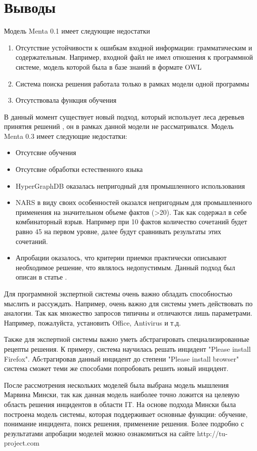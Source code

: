 \section{Выводы}
Модель Menta 0.1 имеет следующие недостатки
\begin{enumerate}
	\item Отсутствие устойчивости к ошибкам входной информации: грамматическим и содержательным. Например, входной файл не имел отношения к программной системе, модель которой была в базе знаний в формате OWL
	\item Система поиска решения работала только в рамках модели одной программы
	\item Отсутствовала функция обучения 
\end{enumerate}\par
В данный момент существует новый подход, который использует леса деревьев принятия решений \cite{DCFOREST}, он в рамках данной модели не рассматривался.
Модель Menta 0.3 имеет следующие недостатки:
\begin{itemize}
	\item Отсутсвие обучения
	\item Отсутсвие обработки естественного языка
	\item HyperGraphDB оказалась непригодный для промышленного использования
	\item NARS в виду своих особенностей оказался непригодным для промышленного применения на значительном объеме фактов (>20). Так как содержал в себе комбинаторный взрыв. Например при 10 фактов количество сочетаний будет равно 45 на первом уровне, далее будут сравнивать результаты этих сочетаний.  
	\item Апробации оказалось, что критерии приемки практически описывают необходимое решение, что являлось недопустимым. Данный подход был описан в статье \cite{SECR}.
\end{itemize}\par
Для программной экспертной системы очень важно обладать способностью мыслить и рассуждать. Например, очень важно  для системы уметь действовать по аналогии. Так как множество запросов типичны и отличаются лишь параметрами. Например, пожалуйста, установить Office, Antivirus и т.д. \par
Также для экспертной системы важно уметь абстрагировать специализированные рецепты решения. К примеру, система научилась решать инцидент "Please install Firefox". Абcтрагировав данный инцидент до степени "Please install browser" система сможет теми же способами попробовать решить новый инцидент.\par
После рассмотрения нескольких моделей была выбрана модель мышления Марвина Мински, так как данная модель наиболее точно ложится на целевую область решения инцидентов в области IT. На основе подхода Мински была построена модель системы, которая поддерживает основные функции: обучение, понимание инцидента, поиск решения, применение решения. Более подробно с результатами апробации моделей можно ознакомиться на сайте http://tu-project.com

\clearpage

